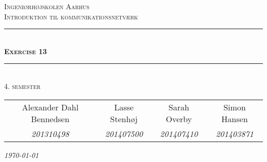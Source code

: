 \newcommand{\HRule}{\rule{\linewidth}{0.1mm}} %
	
\begin{center}
	
\textsc{\LARGE Ingeniørhøjskolen Aarhus}\\[1.5cm] %

\textsc{\large Introduktion til kommunikationsnetværk}\\[2.5cm] 
\HRule \\[0.8cm]
{\huge \bfseries \textsc{Exercise 13}}\\[0.4cm]
\HRule \\[1.5cm]

\textsc{\large 4. semester}\\
\vspace{0.5 in}
\begin{tabular}{c c c c}
	Alexander Dahl Bennedsen & Lasse Stenhøj & Sarah Overby &  Simon Hansen   \\
	\textsl{201310498} & \textsl{201407500} &\textsl{201407410} & \textsl{201403871}
\end{tabular}

\vspace{2.5 in}

{\large\textit{\today}} \\[3cm]
\vfill %
\end{center} %